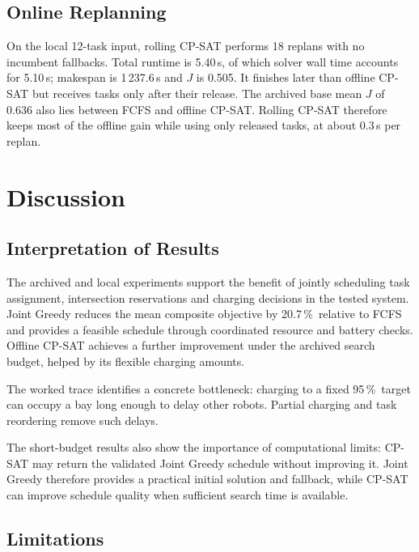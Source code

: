 \documentclass[11pt,a4paper]{article}
\newcommand{\pct}{\,\%}
\begin{document}
\subsection{Online Replanning}

On the local 12-task input, rolling CP-SAT performs 18 replans with no incumbent fallbacks. Total
runtime is 5.40\,s, of which solver wall time accounts for 5.10\,s; makespan is 1\,237.6\,s and $J$ is
0.505. It finishes later than offline CP-SAT but receives tasks only after their release. The archived
base mean $J$ of 0.636 also lies between FCFS and offline CP-SAT. Rolling CP-SAT therefore keeps most of
the offline gain while using only released tasks, at about 0.3\,s per replan.

\section{Discussion}
\label{sec:discussion}

\subsection{Interpretation of Results}

The archived and local experiments support the benefit of jointly scheduling task assignment,
intersection reservations and charging decisions in the tested system. Joint Greedy reduces the mean
composite objective by 20.7\pct\ relative to FCFS and provides a feasible schedule through coordinated
resource and battery checks. Offline CP-SAT achieves a further improvement under the archived search
budget, helped by its flexible charging amounts.

The worked trace identifies a concrete bottleneck: charging to a fixed 95\pct\ target can occupy a bay
long enough to delay other robots. Partial charging and task reordering remove such delays.

The short-budget results also show the importance of computational limits: CP-SAT may return the
validated Joint Greedy schedule without improving it. Joint Greedy therefore provides a practical
initial solution and fallback, while CP-SAT can improve schedule quality when sufficient search time
is available.

\subsection{Limitations}
\end{document}
